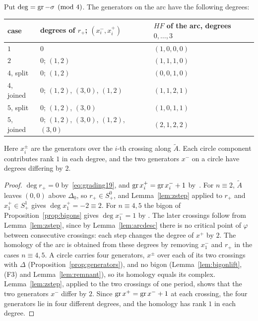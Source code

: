 \begin{proposition}\label{prop:arcgradings}
Put $\deg=\operatorname{gr}-\sigma\pmod 4$. The generators on the arc have the following degrees:
\begin{center}\small
\begin{tabular}{lll}
\toprule
case & degrees of $r_+$; $(x_i^-,x_i^+)$ & $HF$ of the arc, degrees $0,\dots,3$\\
\midrule
$1$ & $0$ & $(1,0,0,0)$\\
$2$ & $0$; $(1,2)$ & $(1,1,1,0)$\\
$4$, split & $0$; $(1,2)$ & $(0,0,1,0)$\\
$4$, joined & $0$; $(1,2)$, $(3,0)$, $(1,2)$ & $(1,1,2,1)$\\
$5$, split & $0$; $(1,2)$, $(3,0)$ & $(1,0,1,1)$\\
$5$, joined & $0$; $(1,2)$, $(3,0)$, $(1,2)$, $(3,0)$ & $(2,1,2,2)$\\
\bottomrule
\end{tabular}
\end{center}
Here $x_i^\pm$ are the generators over the $i$-th crossing along $\tilde A$. Each circle component contributes
rank $1$ in each degree, and the two generators $x^-$ on a circle have degrees differing by $2$.
\end{proposition}

\begin{proof}
$\deg r_+=0$ by~\eqref{eq:grading19}, and $\operatorname{gr} x_i^+=\operatorname{gr} x_i^-+1$ by~\cite[\S5.1]{HHK2}. For $n\equiv2$, $\tilde A$ leaves
$(0,0)$ above $\Delta_0$, so $r_+\in S^0_+$, and Lemma~\ref{lem:zstep} applied to $r_+$ and $x_1^+\in S^1_+$ gives
$\deg x_1^+=-2\equiv2$. For $n\equiv4,5$ the bigon of Proposition~\ref{prop:bigons} gives $\deg x_1^-=1$ by
\cite[Prop.~3.8]{HHK2}. The later crossings follow from Lemma~\ref{lem:zstep}, since by
Lemma~\ref{lem:arcdesc} there is no critical point of $\varphi$ between consecutive crossings: each step changes
the degree of $x^+$ by $2$. The homology of the arc is obtained from these degrees by removing $x_1^-$ and $r_+$
in the cases $n\equiv4,5$. A circle carries four generators, $x^\pm$ over each of its two crossings with $\Delta$
(Proposition~\ref{prop:generators}), and no bigon (Lemma~\ref{lem:bigonlift}, (F3) and Lemma~\ref{lem:remnant}), so its
homology equals its complex. Lemma~\ref{lem:zstep}, applied to the two crossings of one period, shows that the two
generators $x^-$ differ by $2$. Since $\operatorname{gr} x^+=\operatorname{gr} x^-+1$ at each crossing, the four generators lie in four different
degrees, and the homology has rank $1$ in each degree.
\end{proof}

